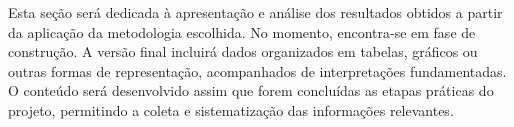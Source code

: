 Esta seção será dedicada à apresentação e análise dos resultados obtidos a partir da aplicação da metodologia escolhida. No momento, encontra-se em fase de construção. 
A versão final incluirá dados organizados em tabelas, gráficos ou outras formas de representação, acompanhados de interpretações fundamentadas. O conteúdo será desenvolvido assim que forem concluídas as etapas práticas do projeto, permitindo a coleta e sistematização das informações relevantes.